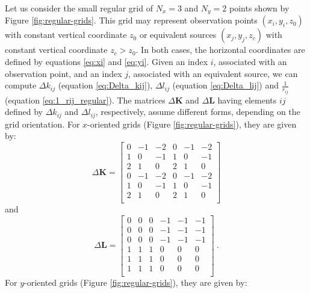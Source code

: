 \documentclass[manuscript]{geophysics}
\begin{document}
	
	Let us consider the small regular grid of $N_{x} = 3$ and $N_{y} = 2$ points shown by
	Figure \ref{fig:regular-grids}. This grid may represent observation points 
	$(x_{i}, y_{i}, z_{0})$ with constant vertical coordinate $z_{0}$ or equivalent sources
	$(x_{j}, y_{j}, z_{c})$ with constant vertical coordinate $z_{c} > z_{0}$. In both cases,
	the horizontal coordinates are defined by equations \ref{eq:xi} and \ref{eq:yi}.
	Given an index $i$, associated with an observation point, and an index $j$, associated with
	an equivalent source, we can compute $\Delta k_{ij}$ (equation \ref{eq:Delta_kij}), 
	$\Delta l_{ij}$ (equation \ref{eq:Delta_lij}) and $\tfrac{1}{r_{ij}}$ 
	(equation \ref{eq:1_rij_regular}). The matrices $\Delta\mathbf{K}$ and $\Delta\mathbf{L}$ 
	having elements $ij$ 
	defined by $\Delta k_{ij}$ and $\Delta l_{ij}$, respectively, assume different forms, depending on
	the grid orientation. For $x$-oriented grids (Figure \ref{fig:regular-grids}), they are given by:
	\begin{equation}
		\Delta\mathbf{K} = \begin{bmatrix}
			0 &  -1 &  -2 &   0 &  -1 &  -2 \\
			1 &   0 &  -1 &   1 &   0 &  -1 \\
			2 &   1 &   0 &   2 &   1 &   0 \\
			0 &  -1 &  -2 &   0 &  -1 &  -2 \\
			1 &   0 &  -1 &   1 &   0 &  -1 \\
			2 &   1 &   0 &   2 &   1 &   0 \\
		\end{bmatrix}
		\label{eq:DK-matrix-x-oriented}
	\end{equation}
	and
	\begin{equation}
		\Delta\mathbf{L} = \begin{bmatrix}
			0 &   0 &   0 &  -1 &  -1 &  -1 \\
			0 &   0 &   0 &  -1 &  -1 &  -1 \\
			0 &   0 &   0 &  -1 &  -1 &  -1 \\
			1 &   1 &   1 &   0 &   0 &   0 \\
			1 &   1 &   1 &   0 &   0 &   0 \\
			1 &   1 &   1 &   0 &   0 &   0 \\
		\end{bmatrix} \: .
		\label{eq:DL-matrix-x-oriented}
	\end{equation}
	For $y$-oriented grids (Figure \ref{fig:regular-grids}), they are given by:
\end{document}
